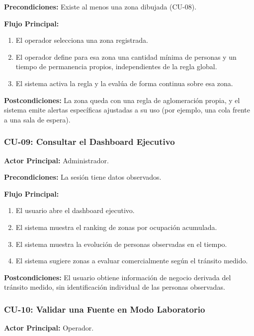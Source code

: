 \textbf{Precondiciones:} Existe al menos una zona dibujada (CU-08).

\textbf{Flujo Principal:}
\begin{enumerate}
  \item El operador selecciona una zona registrada.
  \item El operador define para esa zona una cantidad mínima de personas y un tiempo de
  permanencia propios, independientes de la regla global.
  \item El sistema activa la regla y la evalúa de forma continua sobre esa zona.
\end{enumerate}

\textbf{Postcondiciones:} La zona queda con una regla de aglomeración propia, y el sistema
emite alertas específicas ajustadas a su uso (por ejemplo, una cola frente a una sala de
espera).


\subsubsection{CU-09: Consultar el Dashboard Ejecutivo}
\textbf{Actor Principal:} Administrador.

\textbf{Precondiciones:} La sesión tiene datos observados.

\textbf{Flujo Principal:}
\begin{enumerate}
  \item El usuario abre el dashboard ejecutivo.
  \item El sistema muestra el ranking de zonas por ocupación acumulada.
  \item El sistema muestra la evolución de personas observadas en el tiempo.
  \item El sistema sugiere zonas a evaluar comercialmente según el tránsito medido.
\end{enumerate}

\textbf{Postcondiciones:} El usuario obtiene información de negocio derivada del tránsito
medido, sin identificación individual de las personas observadas.


\subsubsection{CU-10: Validar una Fuente en Modo Laboratorio}
\textbf{Actor Principal:} Operador.

